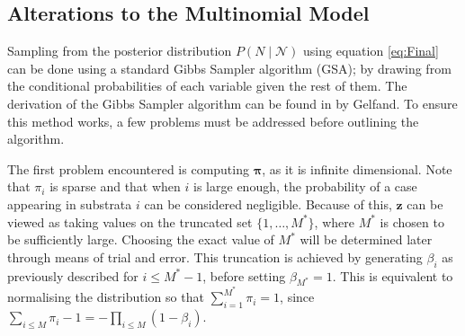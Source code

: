 \documentclass[10pt,a4paper,notitlepage]{article}
\begin{document}
\subsection{Alterations to the Multinomial Model}\label{sc:4.1}
Sampling from the posterior distribution $P(N\mid\mathcal{N})$ using equation \eqref{eq:Final} can be done using a standard Gibbs Sampler algorithm (GSA); by drawing from the conditional probabilities of each variable given the rest of them. The derivation of the Gibbs Sampler algorithm can be found in \cite{Gib} by Gelfand. To ensure this method works, a few problems must be addressed before outlining the algorithm.

The first problem encountered is computing $\bm{\pi}$, as it is infinite dimensional.  Note that $\pi_{i}$ is sparse and that when $i$ is large enough, the probability of a case appearing in substrata $i$ can be considered negligible. Because of this, $\mathbf{z}$ can be viewed as taking values on the truncated set $\{1,\hdots,M^{*}\}$, where $M^{*}$ is chosen to be sufficiently large. Choosing the exact value of $M^{*}$ will be determined later through means of trial and error. This truncation is achieved by generating $\beta_{i}$ as previously described for $i\leq M^{*}-1$, before setting $\beta_{M^{*}}=1$. This is equivalent to normalising the distribution so that $\sum_{i=1}^{M^{*}}\pi_{i}=1$, since $\sum_{i\leq M}\pi_{i}-1=-\prod_{i\leq M}(1-\beta_{i})$.
\end{document}
